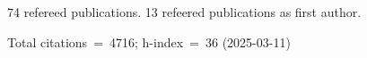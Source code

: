 74 refereed publications. 13 refeered publications as first author.

Total citations~=~4716; h-index~=~36 (2025-03-11)